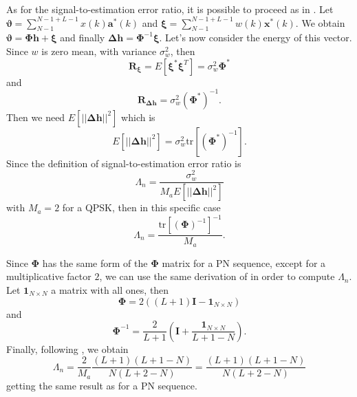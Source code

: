 \documentclass[10pt]{article}
\newcommand{\tr} {\mathrm{tr}}
\begin{document}
As for the signal-to-estimation error ratio, it is possible to proceed as in \cite{bc}. Let $\boldsymbol{\vartheta} = \sum_{N-1}^{N-1+L-1} x(k) \mathbf{a}^*(k)$ and $\boldsymbol{\xi} = \sum_{N-1}^{N-1+L-1} w(k) \mathbf{x}^*(k)$. We obtain $\boldsymbol{\vartheta} = \boldsymbol{\Phi}\mathbf{h} + \boldsymbol{\xi}$ and finally $\boldsymbol{\Delta h} = \boldsymbol{\Phi}^{-1} \boldsymbol{\xi}$. 
Let's now consider the energy of this vector. Since $w$ is zero mean, with variance $\sigma_w^2$, then
\begin{equation}
	\mathbf{R}_{\boldsymbol{\xi}} = E[\boldsymbol{\xi}^*\boldsymbol{\xi}^T] = \sigma_w^2 \mathbf{\Phi}^*
\end{equation}
and
\begin{equation}
	\mathbf{R}_{\boldsymbol{\Delta h}} = \sigma_w^2 (\mathbf{\Phi}^*)^{-1}.
\end{equation}
Then we need $E[||\mathbf{\Delta h}||^2]$ which is
\begin{equation}
	E[||\mathbf{\Delta h}||^2] = \sigma_w^2 \tr[(\mathbf{\Phi}^*)^{-1}].
\end{equation}
Since the definition of signal-to-estimation error ratio is 
\begin{equation}
	\Lambda_n = \frac{\sigma_w^2}{M_a E[||\mathbf{\Delta h}||^2]}
\end{equation}
with $M_a = 2$ for a QPSK, then in this specific case
\begin{equation}
	\Lambda_n = \frac{\tr[(\mathbf{\Phi})^{-1}]^{-1}}{M_a}.
\end{equation}

Since $\mathbf{\Phi}$ has the same form of the $\mathbf{\Phi}$ matrix for a PN sequence, except for a multiplicative factor $2$, we can use the same derivation of \cite{bc} in order to compute $\Lambda_n$. Let $\mathbf{1}_{N\times N}$ a matrix with all ones, then
\begin{equation}
	\mathbf{\Phi} = 2 ((L+1)\mathbf{I} - \mathbf{1}_{N\times N})
\end{equation}
and
\begin{equation}
	\mathbf{\Phi}^{-1} = \frac{2}{L+1} \left( \mathbf{I} + \frac{\mathbf{1}_{N\times N}}{L+1-N} \right).
\end{equation}
Finally, following \cite{bc}, we obtain
\begin{equation}
	\Lambda_n = \frac{2}{M_a}\frac{(L+1)(L+1-N)}{N(L+2-N)} = \frac{(L+1)(L+1-N)}{N(L+2-N)}
	\label{eq:lambdateo}
\end{equation}
getting the same result as for a PN sequence.
\end{document}
